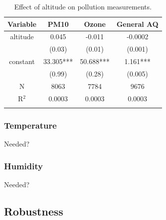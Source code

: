 \documentclass[11pt]{report}
\begin{document}

\begin{table}[!tb]
\centering
\caption{Effect of altitude on pollution measurements.}
\label{tab:altitude}
\begin{tabular}{c c c c}
\toprule
Variable & PM10 & Ozone & General AQ \\ 
\midrule
altitude	& 0.045		& -0.011		& -0.0002 	\\
		& (0.03)		& (0.01)		& (0.001)   \\
constant	& 33.305***	& 50.688***	& 1.161*** \\
		& (0.99)		& (0.28)		& (0.005)   \\ \midrule
 N		& 8063 		& 7784   		& 9676   	\\          
R$^{2}$	& 0.0003   	& 0.0003		& 0.0003   \\
\bottomrule
\addlinespace[1ex]
\multicolumn{4}{l}{\textsuperscript{***}$p<0.01$, 
  \textsuperscript{**}$p<0.05$, 
  \textsuperscript{*}$p<0.1$}
\end{tabular}
\end{table}

\subsubsection{Temperature}

Needed?

\subsubsection{Humidity}

Needed?

\subsection{Robustness}
\end{document}
